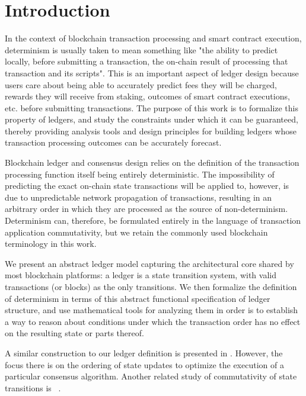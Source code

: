 \section{Introduction}
\label{sec:intro}

In the context of blockchain transaction processing and smart contract execution,
determinism is usually taken to mean something like "the ability to predict locally,
before submitting a transaction, the on-chain result of processing that transaction and its scripts".
This is an important aspect of ledger design because users care about being able to accurately predict
fees they will be charged, rewards they will receive from staking, outcomes of
smart contract executions, etc. before submitting transactions. The purpose of this
work is to formalize this property of ledgers, and study the constraints under
which it can be guaranteed, thereby providing analysis tools and design principles for building ledgers
whose transaction processing outcomes can be accurately forecast.

Blockchain ledger and consensus design relies on the definition of the transaction processing function
itself being entirely deterministic. The impossibility of predicting
the exact on-chain state transactions will be applied to, however, is due to
unpredictable network propagation of transactions, resulting in an arbitrary
order in which they are processed as the source of non-determinism. Determinism
can, therefore, be formulated entirely in the language of transaction application commutativity,
but we retain the commonly used blockchain terminology in this work.

We present an abstract
ledger model capturing the architectural core shared by most blockchain platforms:
a ledger is a state transition system, with valid transactions (or blocks) as the only transitions.
We then formalize the definition of determinism in terms of this abstract functional
specification of ledger structure, and use mathematical tools
for analyzing them in order is to establish a way to reason about
conditions under which the transaction order has no effect on the resulting state
or parts thereof.

A similar construction to our ledger definition is presented in \cite{paxos}.
However, the focus there is on the ordering of state updates
to optimize the execution of a particular consensus algorithm.
Another related study of commutativity of state transitions is ~\cite{commautomata}.
